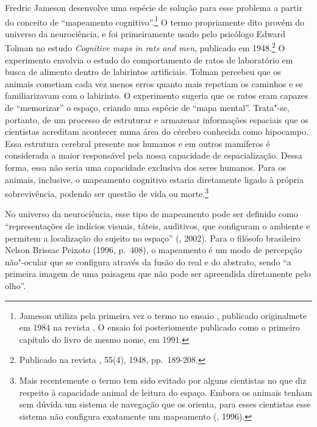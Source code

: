 Fredric Jameson desenvolve uma espécie de solução para esse problema a
partir do conceito de ``mapeamento cognitivo''.\footnote{Jameson utiliza
  pela primeira vez o termo no ensaio {}, publicado originalmete em 1984 na
  revista {}. O ensaio foi posteriomente publicado como o
  primeiro capítulo do livro de mesmo nome, em 1991.} O termo
propriamente dito provém do universo da neurociência, e foi
primeiramente usado pelo psicólogo Edward Tolman no estudo
\emph{Cognitive maps in rats and men}, publicado em 1948.\footnote{Publicado na
  revista {}, 55(4), 1948, pp.~189-208.} O
experimento envolvia o estudo do comportamento de ratos de laboratório
em busca de alimento dentro de labirintos artificiais. Tolman percebeu
que os animais cometiam cada vez menos erros quanto mais repetiam os
caminhos e se familiarizavam com o labirinto. O experimento sugeria que
os ratos eram capazes de ``memorizar'' o espaço, criando uma espécie de
``mapa mental''. Trata"-se, portanto, de um processo de estruturar e
armazenar informações espaciais que os cientistas acreditam acontecer
numa área do cérebro conhecida como hipocampo. Essa estrutura cerebral
presente nos humanos e em outros mamíferos é considerada a maior
responsável pela nossa capacidade de espacialização. Dessa forma, essa
não seria uma capacidade exclusiva dos seres humanos. Para os animais,
inclusive, o mapeamento cognitivo estaria diretamente ligado à própria
sobrevivência, podendo ser questão de vida ou morte.\footnote{Mais
  recentemente o termo tem sido evitado por alguns cientistas no que diz
  respeito à capacidade animal de leitura do espaço. Embora os animais
  tenham sem dúvida um sistema de navegação que os orienta, para esses
  cientistas esse sistema não configura exatamente um mapeamento
  (, 1996).}

No universo da neurociência, esse tipo de mapeamento pode ser definido
como ``representações de indícios visuais, táteis, auditivos, que
configuram o ambiente e permitem a localização do sujeito no espaço''
(, 2002). Para o filósofo brasileiro Nelson Brissac Peixoto (1996, p.~408), o mapeamento é um modo de percepção não"-ocular que se configura
através da fusão do real e do abstrato, sendo ``a primeira imagem de uma
paisagem que não pode ser apreendida diretamente pelo olho''.

